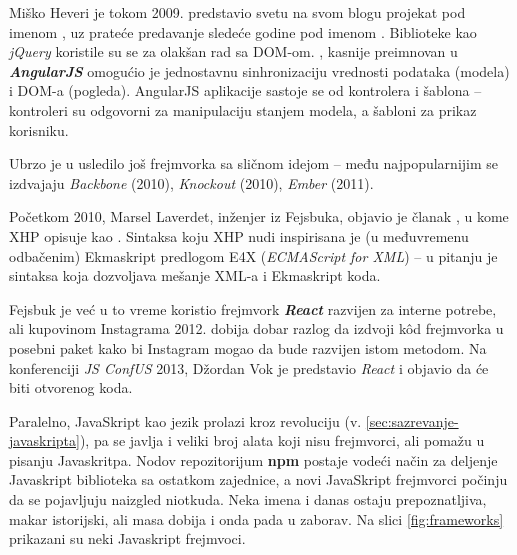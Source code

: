 Miško Heveri je tokom 2009. predstavio svetu na svom blogu projekat pod imenom  \cite{misko:hello-world}, uz prateće predavanje sledeće godine pod imenom  \cite{misko-radically-different-ajax-apps}.
Biblioteke kao \textsl{jQuery} koristile su se za olakšan rad sa DOM-om.
, kasnije preimnovan u \textsl{\textbf{AngularJS}} omogućio je jednostavnu sinhronizaciju  vrednosti podataka (modela) i DOM-a (pogleda).
AngularJS aplikacije sastoje se od kontrolera i šablona -- kontroleri su odgovorni za manipulaciju stanjem modela, a šabloni za prikaz korisniku.

Ubrzo je u usledilo još frejmvorka sa sličnom idejom -- među najpopularnijim se izdvajaju \textsl{Backbone} (2010), \textsl{Knockout} (2010), \textsl{Ember} (2011).

Početkom 2010, Marsel Laverdet, inženjer iz Fejsbuka, objavio je članak , u kome XHP opisuje kao  \cite{facebook:xhp}.
Sintaksa koju XHP nudi inspirisana je (u međuvremenu odbačenim) Ekmaskript predlogom E4X (\textsl{ECMAScript for XML}) -- u pitanju je sintaksa koja dozvoljava mešanje XML-a i Ekmaskript koda.

Fejsbuk je već u to vreme koristio frejmvork \textsl{\textbf{React}} razvijen za interne potrebe, ali kupovinom Instagrama 2012. dobija dobar razlog da izdvoji kôd frejmvorka u posebni paket kako bi Instagram mogao da bude razvijen istom metodom.
Na konferenciji \textit{JS ConfUS} 2013, Džordan Vok je predstavio \textsl{React} i objavio da će biti otvorenog koda.

Paralelno, JavaSkript kao jezik prolazi kroz revoluciju (v. \cref{sec:sazrevanje-javaskripta}), pa se javlja i veliki broj alata koji nisu frejmvorci, ali pomažu u pisanju Javaskritpa.
Nodov repozitorijum \textbf{npm} postaje vodeći način za deljenje Javaskript biblioteka sa ostatkom zajednice, a novi JavaSkript frejmvorci počinju da se pojavljuju naizgled niotkuda.
Neka imena i danas ostaju prepoznatljiva, makar istorijski, ali masa dobija  i onda pada u zaborav.
Na slici \ref{fig:frameworks} prikazani su neki Javaskript frejmvoci.


